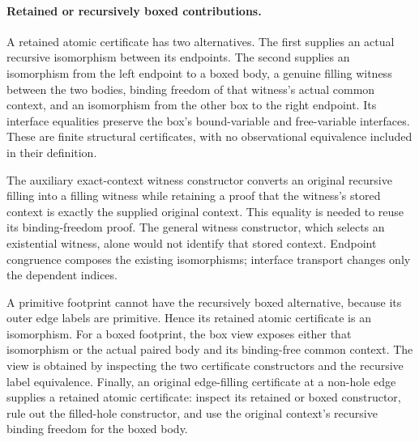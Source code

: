 \paragraph{Retained or recursively boxed contributions.}
A retained atomic certificate has two alternatives. The first supplies an
actual recursive isomorphism between its endpoints. The second supplies an
isomorphism from the left endpoint to a boxed body, a genuine filling
witness between the two bodies, binding freedom of that witness's actual
common context, and an isomorphism from the other box to the right endpoint.
Its interface equalities preserve the box's bound-variable and free-variable
interfaces. These are finite structural certificates, with no observational
equivalence included in their definition.

The auxiliary exact-context witness constructor converts an original
recursive filling into a filling witness while retaining a proof that the
witness's stored context is exactly the supplied original context. This
equality is needed to reuse its binding-freedom proof. The general witness
constructor, which selects an existential witness, alone would not identify
that stored context. Endpoint congruence composes the existing isomorphisms;
interface transport changes only the dependent indices.





A primitive footprint cannot have the recursively boxed alternative, because
its outer edge labels are primitive. Hence its retained atomic certificate
is an isomorphism. For a boxed footprint, the box view exposes either that
isomorphism or the actual paired body and its binding-free common context.
The view is obtained by inspecting the two certificate constructors and the
recursive label equivalence. Finally, an original edge-filling certificate
at a non-hole edge supplies a retained atomic certificate: inspect its
retained or boxed constructor, rule out the filled-hole constructor, and
use the original context's recursive binding freedom for the boxed body.



